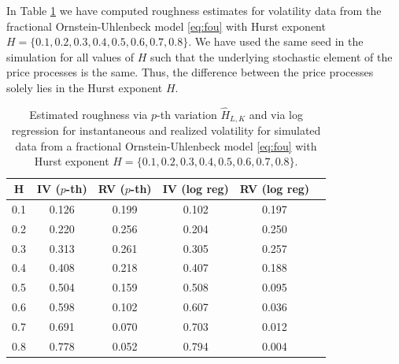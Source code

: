 \documentclass{article}
\begin{document}
In Table \ref{tab:ex7table} we have computed roughness estimates for volatility data from the fractional Ornstein-Uhlenbeck model \eqref{eq:fou} with Hurst exponent $H=\{0.1,0.2,0.3,0.4,0.5,0.6,0.7,0.8\}$. We have used the same seed in the simulation for all values of $H$ such that the underlying stochastic element of the price processes is the same. Thus, the difference between the price processes solely lies in the Hurst exponent $H$.
\begin{table}[htbp]
    \centering
    \begin{tabular}{cccccc}
        \toprule
        H & IV ($p$-th) & RV ($p$-th) & IV (log reg) & RV (log reg)\\
        \midrule
        0.1 & 0.126 & 0.199 & 0.102 & 0.197\\
        0.2 & 0.220 & 0.256 & 0.204 & 0.250\\
        0.3 & 0.313 & 0.261 & 0.305 & 0.257\\
        0.4 & 0.408 & 0.218 & 0.407 & 0.188\\
        0.5 & 0.504 & 0.159 & 0.508 & 0.095\\
        0.6 & 0.598 & 0.102 & 0.607 & 0.036\\
        0.7 & 0.691 & 0.070 & 0.703 & 0.012\\
        0.8 & 0.778 & 0.052 & 0.794 & 0.004\\
        \bottomrule
    \end{tabular}
    \caption{Estimated roughness via $p$-th variation $\widehat{H}_{L,K}$ and via log regression for instantaneous and realized volatility for simulated data from a fractional Ornstein-Uhlenbeck model \eqref{eq:fou} with Hurst exponent $H=\{0.1,0.2,0.3,0.4,0.5,0.6,0.7,0.8\}$.}
    \label{tab:ex7table}
\end{table}\\\\
\end{document}
